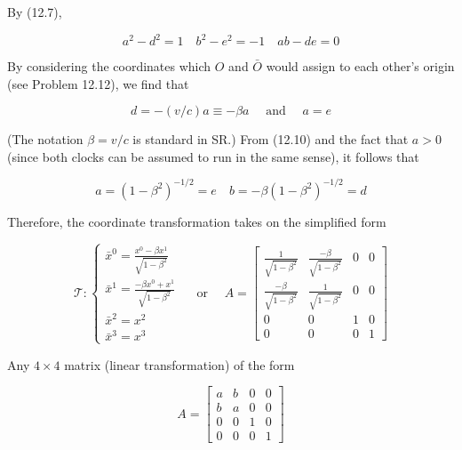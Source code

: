 \documentclass[10pt]{article}
\begin{document}
By (12.7),


\begin{equation*}
a^{2}-d^{2}=1 \quad b^{2}-e^{2}=-1 \quad a b-d e=0 \tag{12.10}
\end{equation*}


By considering the coordinates which $O$ and $\bar{O}$ would assign to each other's origin (see Problem 12.12), we find that


\begin{equation*}
d=-(v / c) a \equiv-\beta a \quad \text { and } \quad a=e \tag{12.11}
\end{equation*}


(The notation $\beta=v / c$ is standard in SR.) From (12.10) and the fact that $a>0$ (since both clocks can be assumed to run in the same sense), it follows that


\begin{equation*}
a=\left(1-\beta^{2}\right)^{-1 / 2}=e \quad b=-\beta\left(1-\beta^{2}\right)^{-1 / 2}=d \tag{12.12}
\end{equation*}


Therefore, the coordinate transformation takes on the simplified form

\[
\mathscr{T}:\left\{\begin{array}{l}
\bar{x}^{0}=\frac{x^{0}-\beta x^{1}}{\sqrt{1-\beta^{2}}}  \tag{12.13}\\
\bar{x}^{1}=\frac{-\beta x^{0}+x^{1}}{\sqrt{1-\beta^{2}}} \\
\bar{x}^{2}=x^{2} \\
\bar{x}^{3}=x^{3}
\end{array} \quad \text { or } \quad A=\left[\begin{array}{cccc}
\frac{1}{\sqrt{1-\beta^{2}}} & \frac{-\beta}{\sqrt{1-\beta^{2}}} & 0 & 0 \\
\frac{-\beta}{\sqrt{1-\beta^{2}}} & \frac{1}{\sqrt{1-\beta^{2}}} & 0 & 0 \\
0 & 0 & 1 & 0 \\
0 & 0 & 0 & 1
\end{array}\right]\right.
\]

Any $4 \times 4$ matrix (linear transformation) of the form

$$
A=\left[\begin{array}{llll}
a & b & 0 & 0 \\
b & a & 0 & 0 \\
0 & 0 & 1 & 0 \\
0 & 0 & 0 & 1
\end{array}\right]
$$
\end{document}
